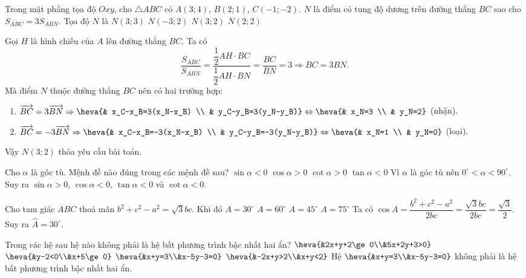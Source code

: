 \begin{ex}%
	Trong mặt phẳng tọa độ $Oxy$, cho $\triangle ABC$ có $A(3;4)$, $B(2;1)$, $C(-1;-2)$. $N$ là điểm có tung độ dương trên đường thẳng $BC$ sao cho $S_{ABC}=3S_{ABN}$. Tọa độ $N$ là 
	\choice 
	{$N(3;3)$}
	{$N(-3;2)$}
	{\True $N(3;2)$}
	{$N(2;2)$}
	\loigiai 
	{
		Gọi $H$ là hình chiếu của $A$ lên đường thẳng $BC$. Ta có
		\[\dfrac{S_{ABC}}{S_{ABN}}=\dfrac{\dfrac{1}{2}AH\cdot BC}{\dfrac{1}{2}AH\cdot BN}=\dfrac{BC}{BN}=3\Rightarrow BC=3BN. \]
		Mà điểm $N$ thuộc đường thẳng $BC$ nên có hai trường hợp:
		\begin{enumerate}[TH1.]
			\item $\overrightarrow{BC}=3\overrightarrow{BN}\Rightarrow \heva{& x_C-x_B=3(x_N-x_B) \\ & y_C-y_B=3(y_N-y_B)}\Leftrightarrow \heva{& x_N=3 \\ & y_N=2}$ (nhận).
			\item $\overrightarrow{BC}=-3\overrightarrow{BN}\Rightarrow \heva{& x_C-x_B=-3(x_N-x_B) \\ & y_C-y_B=-3(y_N-y_B)}\Leftrightarrow \heva{& x_N=1 \\ & y_N=0}$ (loại).
		\end{enumerate}
	Vậy $N(3;2)$ thỏa yêu cầu bài toán.
	}
\end{ex}

\begin{ex}%
	Cho $\alpha$ là góc tù. Mệnh đề nào đúng trong các mệnh đề sau?
	\choice 
	{$\sin\alpha<0$}
	{$\cos\alpha>0$}
	{$\cot\alpha>0$}
	{\True $\tan\alpha<0$}
	\loigiai 
	{
		Vì $\alpha$ là góc tù nên $0^{\circ}<\alpha<90^{\circ}$.\\
		Suy ra $\sin \alpha >0$, $\cos \alpha <0$, $\tan \alpha <0$ và $\cot \alpha <0$.
	}
\end{ex}
\begin{ex}%
	Cho tam giác $ABC$ thoả mãn $b^2+c^2-a^2=\sqrt{3} b c$. Khi đó 
	\choice 
	{\True $A=30^\circ$}
	{$A=60^\circ$}
	{$A=45^\circ$}
	{$A=75^\circ$}
	\loigiai 
	{
		Ta có $\cos A=\dfrac{b^2+c^2-a^2}{2bc}=\dfrac{\sqrt{3}bc}{2bc}=\dfrac{\sqrt{3}}{2}$.\\
		Suy ra $\widehat{A}=30^\circ$.
	}
\end{ex}

\begin{ex}%
	Trong các hệ sau hệ nào không phải là hệ bất phương trình bậc nhất hai ẩn?
	\choice 
	{$\heva{&2x+y+2\ge 0\\&5x+2y+3>0}$}
	{$\heva{&y-2<0\\&x+5\ge 0}$}
	{\True $\heva{&x+y=3\\&x-5y-3=0}$}
	{$\heva{&-2x+y>2\\&x+y<2}$}
	\loigiai 
	{
		Hệ $\heva{&x+y=3\\&x-5y-3=0}$ không phải là hệ bất phương trình bậc nhất hai ẩn.
	}
\end{ex}

